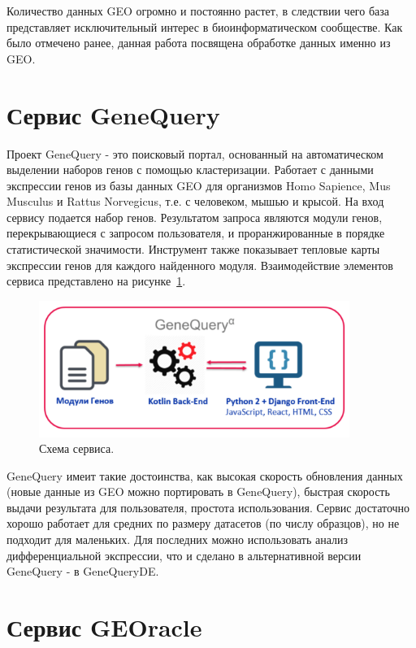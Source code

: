\documentclass[times,specification,annotation]{itmo-student-thesis}
\begin{document}
Количество данных GEO огромно и постоянно растет, в следствии чего база представляет исключительный интерес в биоинформатическом сообществе. Как было отмечено ранее, данная работа посвящена обработке данных именно из GEO.   

\section{Сервис GeneQuery}

Проект GeneQuery\cite{GeneQuery} - это поисковый портал, основанный на автоматическом выделении наборов генов с помощью кластеризации. Работает с данными экспрессии генов из базы данных GEO для организмов Homo Sapience, Mus Musculus и Rattus Norvegicus, т.е. с человеком, мышью и крысой. На вход сервису подается набор генов. Результатом запроса являются модули генов, перекрывающиеся с запросом пользователя, и проранжированные в порядке статистической значимости. Инструмент также показывает тепловые карты экспрессии генов для каждого найденного модуля. 
Взаимодействие элементов сервиса представлено на рисунке~\ref{GeneQuery_service}. 

\begin{figure}[!h]
    \caption{Схема сервиса.}\label{GeneQuery_service}
    \centering
    \includegraphics[width=0.9\textwidth]{GeneQuery_scheme}
\end{figure} 

GeneQuery имеит такие достоинства, как высокая скорость обновления данных (новые данные из GEO можно портировать в GeneQuery), быстрая скорость выдачи результата для пользователя, простота использования. Сервис достаточно хорошо работает для средних по размеру датасетов (по числу образцов), но не подходит для маленьких. Для последних можно использовать анализ дифференциальной экспрессии, что и сделано в альтернативной версии GeneQuery - в GeneQueryDE. 

\section{Сервис GEOracle}
\end{document}
